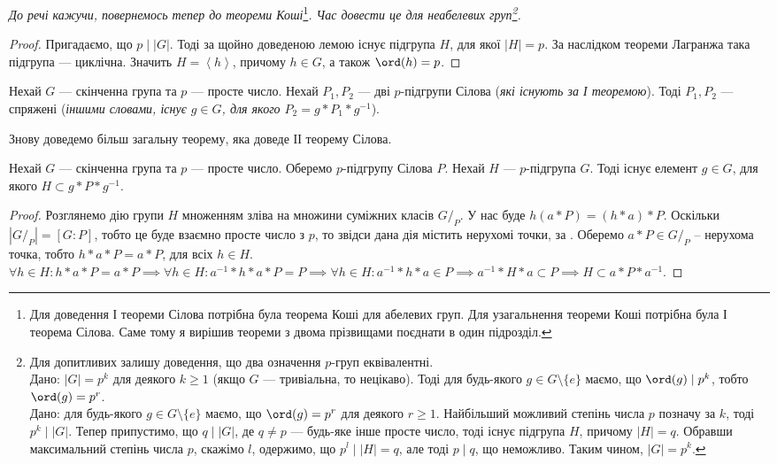 \documentclass{math_library}
\begin{document}
\textit{До речі кажучи, повернемось тепер до теореми Коші}\footnote{Для доведення І теореми Сілова потрібна була теорема Коші для абелевих груп. Для узагальнення теореми Коші потрібна була І теорема Сілова. Саме тому я вирішив теореми з двома прізвищами поєднати в один підрозділ.}\textit{. Час довести це для неабелевих груп\footnote{Для допитливих залишу доведення, що два означення $p$-груп еквівалентні.\\
\rightproof Дано: $|G| = p^k$ для деякого $k \geq 1$ (якщо $G$ --- тривіальна, то нецікаво). Тоді для будь-якого $g \in G \setminus \{e\}$ маємо, що $\ord (g) \mid p^k$, тобто $\ord(g) = p^r$.
\bigskip \\
\leftproof Дано: для будь-якого $g \in G \setminus \{e\}$ маємо, що $\ord (g) = p^r$ для деякого $r \geq 1$. Найбільший можливий степінь числа $p$ позначу за $k$, тоді $p^k \mid |G|$. Тепер припустимо, що $q \mid |G|$, де $q \neq p$ --- будь-яке інше просте число, тоді існує підгрупа $H$, причому $|H| = q$. Обравши максимальний степінь числа $p$, скажімо $l$, одержимо, що $p^l \mid |H| = q$, але тоді $p \mid q$, що неможливо. Таким чином, $|G| = p^k$.
}.
}

\begin{proof}
Пригадаємо, що $p \mid |G|$. Тоді за щойно доведеною лемою існує підгрупа $H$, для якої $|H| = p$. За наслідком теореми Лагранжа така підгрупа --- циклічна. Значить $H = \left<h\right>$, причому $h \in G$, а також $\ord(h) = p$.
\end{proof}

\begin{theorem}
Нехай $G$ --- скінченна група та $p$ --- просте число. Нехай $P_1,P_2$ --- дві $p$-підгрупи Сілова (\textit{які існують за І теоремою}). Тоді $P_1,P_2$ --- спряжені (\textit{іншими словами, існує $g \in G$, для якого $P_2 = g*P_1*g^{-1}$}).
\end{theorem}

Знову доведемо більш загальну теорему, яка доведе ІІ теорему Сілова.

\begin{theorem}
Нехай $G$ --- скінченна група та $p$ --- просте число. Оберемо $p$-підгрупу Сілова $P$. Нехай $H$ --- $p$-підгрупа $G$. Тоді існує елемент $g \in G$, для якого $H \subset g*P*g^{-1}$.
\end{theorem}

\begin{proof}
Розглянемо дію групи $H$ множенням зліва на множини суміжних класів $G/_P$. У нас буде $h (a*P) = (h*a)*P$. Оскільки $|G/_P| = [G:P]$, тобто це буде взаємно просте число з $p$, то звідси дана дія містить нерухомі точки, за . Оберемо $a*P \in G/_P$ -- нерухома точка, тобто $h*a*P = a*P$, для всіх $h \in H$.\\
$\forall h \in H: h*a*P = a*P \implies \forall h \in H: a^{-1}*h*a*P = P \implies \forall h \in H: a^{-1}*h*a \in P \implies a^{-1}*H*a \subset P \implies H \subset a*P*a^{-1}$.
\end{proof}
\end{document}
